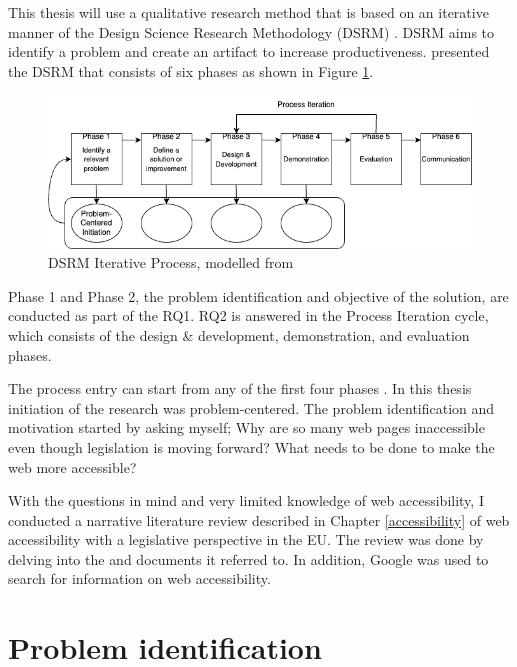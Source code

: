This thesis will use a qualitative research method that is based on an iterative manner of the Design Science Research Methodology (DSRM) \citep{designsciencemethodology, iterativedesignscience}. DSRM aims to identify a problem and create an artifact to increase productiveness. \textcite{iterativedesignscience} presented the DSRM that consists of six phases as shown in Figure \ref{fig:design-science}.

\begin{figure}
    \centering
    \includegraphics[width=1\linewidth]{DSRM.png}
    \caption{DSRM Iterative Process, modelled from \textcite{iterativedesignscience}}
    \label{fig:design-science}
\end{figure}

Phase 1 and Phase 2, the problem identification and objective of the solution, are conducted as part of the RQ1. RQ2 is answered in the Process Iteration cycle, which consists of the design \& development, demonstration, and evaluation phases.

The process entry can start from any of the first four phases \citep{iterativedesignscience}. In this thesis initiation of the research was problem-centered. The problem identification and motivation started by asking myself; Why are so many web pages inaccessible even though legislation is moving forward? What needs to be done to make the web more accessible? 

With the questions in mind and very limited knowledge of web accessibility, I conducted a narrative literature review described in Chapter \ref{accessibility} of web accessibility with a legislative perspective in the EU. The review was done by delving into the \textcite{eudirective2016} and documents it referred to. In addition, Google was used to search for information on web accessibility.

\section{Problem identification}


